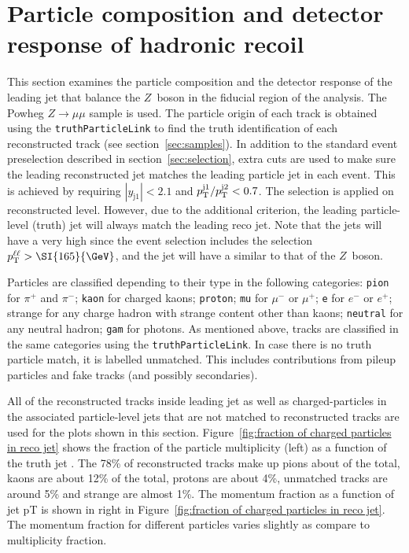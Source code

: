 \section{Particle composition and detector response of hadronic recoil}

This section examines the particle composition and the detector response of the leading jet that balance the $Z$~boson in the fiducial region of the analysis.
The Powheg $Z\to \mu\mu$ sample is used. The particle origin of each track is obtained using the \texttt{truthParticleLink} to find the truth identification of each reconstructed track (see section~\ref{sec:samples}). In addition to the standard event preselection described in section~\ref{sec:selection}, extra cuts are used to make sure the leading reconstructed jet matches the leading particle jet in each event.
This is achieved by requiring $|y_\mathrm{j1}|<2.1$ and $p_\mathrm{T}^{\mathrm{j1}} / p_\mathrm{T}^{\mathrm{j2}} < 0.7$. The selection is applied on reconstructed level. However, due to the additional criterion, the leading particle-level (truth) jet will always match the leading reco jet. Note that the jets will have a very high \pt{} since the event selection includes the selection $\pTll > \SI{165}{\GeV}$, and the jet will have a similar \pt{} to that of the $Z$~boson.

Particles are classified depending to their type in the following categories: \texttt{pion} for $\pi^+$ and $\pi^-$; \texttt{kaon} for charged kaons; \texttt{proton};
\texttt{mu} for $\mu^-$ or $\mu^+$; \texttt{e} for $e^-$ or $e^+$;
strange for any charge hadron with strange content other than kaons; \texttt{neutral} for any neutral hadron; \texttt{gam} for photons. As mentioned above, tracks are classified in the same categories using the \texttt{truthParticleLink}. In case there is no truth particle match, it is labelled unmatched. This includes contributions from pileup particles and fake tracks (and possibly secondaries).


All of the reconstructed tracks inside leading jet as well as charged-particles in the associated particle-level jets that are not matched to reconstructed tracks are used for the plots shown in this section. Figure~\ref{fig:fraction of charged particles in reco jet} shows the fraction of the particle multiplicity (left) as a function of the truth jet \pT. The 78\% of reconstructed tracks make up pions about of the total, kaons are about 12\% of the total, protons are about 4\%, unmatched tracks are around 5\% and strange are almost 1\%. The momentum fraction as a function of jet pT is shown in right in Figure~\ref{fig:fraction of charged particles in reco jet}. The momentum fraction for different particles varies slightly as compare to multiplicity fraction.

